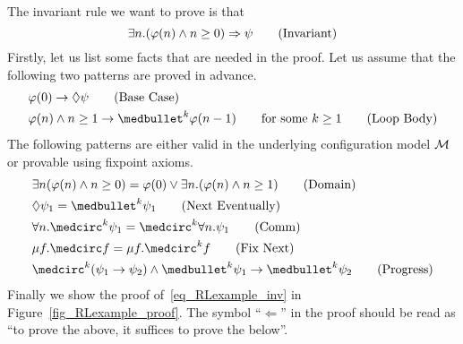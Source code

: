 \documentclass{amsart}
\begin{document}
The invariant rule we want to prove is that
\begin{equation}\label{eq_RLexample_inv}
\exists n . (\varphi(n) \wedge n \ge 0) \Rightarrow \psi \tag{Invariant}
\end{equation}
Firstly, let us list some facts that are needed in the proof.
Let us assume that the following two patterns are proved in advance.
\begin{align}
&\varphi(0) \imp \eventually \psi
\tag{Base Case}\label{eq_RLexample_base_case}
\\
&\varphi(n) \wedge n \ge 1 \imp \snext^k \varphi(n-1)
\qquad \text{for some $k \ge 1$}
\tag{Loop Body}\label{eq_RLexample_loop_body}
\end{align}
The following patterns are either valid in the underlying
configuration model $\mathcal{M}$ or provable using fixpoint axioms.
\begin{align}
&\exists n (\varphi(n) \wedge n \ge 0) 
= \varphi(0) \vee \exists n . (\varphi(n) \wedge n \ge 1)
\tag{Domain}\label{eq_RLexample_domain}
\\
&\eventually \psi_1 = \snext^k \psi_1
\tag{Next Eventually}\label{eq_RLexample_next_eventually}
\\
&\forall n . \wnext^k \psi_1 = \wnext^k \forall n . \psi_1
\tag{Comm}\label{eq_RLexample_comm}
\\
&\mu f . \wnext f = \mu f . \wnext^k f
\tag{Fix Next}\label{eq_RLexample_fix_wnext}
\\
&\wnext^k(\psi_1 \imp \psi_2) \wedge \snext^k \psi_1 \imp \snext^k \psi_2
\tag{Progress}\label{eq_RLexample_progress}
\end{align}
Finally we show the proof of~\eqref{eq_RLexample_inv} in 
Figure~\ref{fig_RLexample_proof}.
The symbol ``$\Longleftarrow$'' in the proof should be read as
``to prove the above, it suffices to prove the below''.
\end{document}
